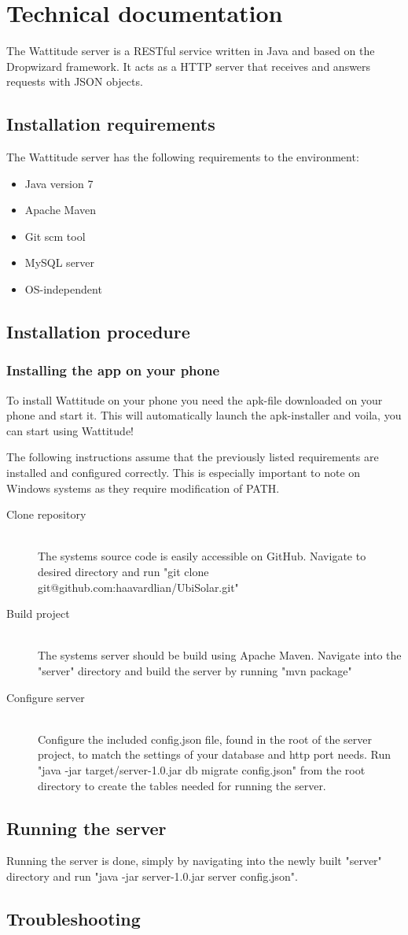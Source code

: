\chapter{Technical documentation}
\label{sec:technicalDocumentation}
The Wattitude server is a RESTful service written in Java and based on the Dropwizard framework. It acts as a HTTP server that receives and answers requests with JSON objects. 
\section{Installation requirements}
The Wattitude server has the following requirements to the environment:
\begin{itemize}
\item Java version 7
\item Apache Maven 
\item Git scm tool
\item MySQL server
\item OS-independent
\end{itemize}
\section{Installation procedure}

\subsection{Installing the app on your phone}
\label{sec:installWattitudePhone}
To install Wattitude on your phone you need the apk-file downloaded on your phone and start it. This will automatically launch the apk-installer and voila, you can start using Wattitude!

The following instructions assume that the previously listed requirements are installed and configured correctly. This is especially important to note on Windows systems as they require modification of PATH.
\begin{description}
  \item[Clone repository] \hfill \\
  The systems source code is easily accessible on GitHub. Navigate to desired directory and run "git clone git@github.com:haavardlian/UbiSolar.git"
  \item[Build project] \hfill \\
  The systems server should be build using Apache Maven. Navigate into the "server" directory and build the server by running "mvn package"
  \item[Configure server] \hfill \\
  Configure the included config.json file, found in the root of the server project, to match the settings of your database and http port needs. Run "java -jar target/server-1.0.jar db migrate config.json" from the root directory to create the tables needed for running the server. 
  
\end{description}

\section{Running the server}
Running the server is done, simply by navigating into the newly built "server" directory and run "java -jar server-1.0.jar server config.json".

\section{Troubleshooting}